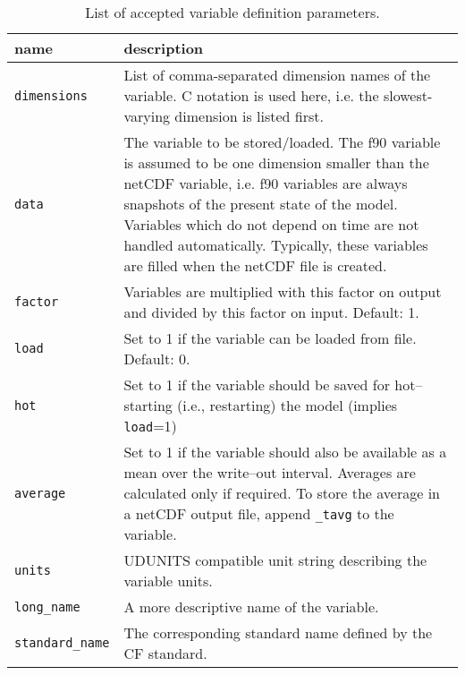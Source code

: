 \begin{table}[htbp]
 \begin{center}
  \begin{tabular*}{\textwidth}{@{\extracolsep{\fill}}|l|p{10cm}|}
    \hline
    name & description \\
    \hline
    \hline
    \texttt{dimensions} & List of comma-separated dimension names of the variable. C notation is used here, i.e. the slowest-varying dimension is listed first.\\
    \hline
    \texttt{data} & The variable to be stored/loaded. The f90 variable is assumed to be one dimension smaller than the netCDF variable, i.e. f90 variables are always snapshots of the present state of the model. Variables which do not depend on time are not handled automatically. Typically, these variables are filled when the netCDF file is created.\\
    \hline
    \texttt{factor} & Variables are multiplied with this factor on output and divided by this factor on input. Default: 1.\\
    \hline
    \texttt{load} & Set to 1 if the variable can be loaded from file. Default: 0.\\
    \hline
    \texttt{hot} & Set to 1 if the variable should be saved for hot--starting (i.e., restarting) the model (implies \texttt{load}=1)\\
    \hline
    \texttt{average} & Set to 1 if the variable should also be available as a mean over the write--out interval. Averages are calculated only if required. To store the average in a netCDF output file, append \texttt{\_tavg} to the variable.\\
    \hline
    \texttt{units} & UDUNITS compatible unit string describing the variable units.\\
    \hline
    \texttt{long\_name} & A more descriptive name of the variable.\\
    \hline
    \texttt{standard\_name} & The corresponding standard name defined by the CF standard.\\
    \hline
  \end{tabular*}
  \caption{List of accepted variable definition parameters.}
  \label{dg.tab.vdf}
 \end{center}
\end{table}

